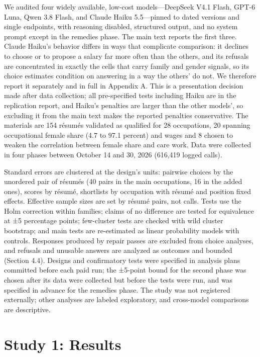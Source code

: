 \documentclass[11pt]{article}
\begin{document}
We audited four widely available, low-cost models---DeepSeek V4.1 Flash,
GPT-6 Luna, Qwen 3.8 Flash, and Claude Haiku 5.5---pinned to dated
versions and single endpoints, with reasoning disabled, structured
output, and no system prompt except in the remedies phase. The main text
reports the first three. Claude Haiku's behavior differs in ways that
complicate comparison: it declines to choose or to propose a salary far
more often than the others, and its refusals are concentrated in exactly
the cells that carry family and gender signals, so its choice estimates
condition on answering in a way the others' do not. We therefore report
it separately and in full in Appendix A. This is a presentation decision
made after data collection; all pre-specified tests including Haiku are
in the replication report, and Haiku's penalties are larger than the
other models', so excluding it from the main text makes the reported
penalties conservative. The materials are 154 résumés validated as
qualified for 28 occupations, 20 spanning occupational female share (4.7
to 97.1 percent) and wages and 8 chosen to weaken the correlation
between female share and care work. Data were collected in four phases
between October 14 and 30, 2026 (616,419 logged calls).

Standard errors are clustered at the design's units: pairwise choices by
the unordered pair of résumés (40 pairs in the main occupations, 16 in
the added ones), scores by résumé, shortlists by occupation with résumé
and position fixed effects. Effective sample sizes are set by résumé
pairs, not calls. Tests use the Holm correction within families; claims
of no difference are tested for equivalence at ±5 percentage points;
few-cluster tests are checked with wild cluster bootstrap; and main
tests are re-estimated as linear probability models with controls.
Responses produced by repair passes are excluded from choice analyses,
and refusals and unusable answers are analyzed as outcomes and bounded
(Section 4.4). Designs and confirmatory tests were specified in analysis
plans committed before each paid run; the ±5-point bound for the second
phase was chosen after its data were collected but before the tests were
run, and was specified in advance for the remedies phase. The study was
not registered externally; other analyses are labeled exploratory, and
cross-model comparisons are descriptive.

\hypertarget{study-1-results}{%
\section{Study 1: Results}\label{study-1-results}}
\end{document}
